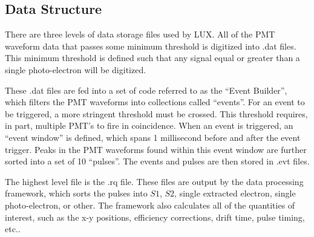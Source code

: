 \subsection{Data Structure}
There are three levels of data storage files used by LUX. All of the PMT waveform data that passes some minimum threshold is digitized into .dat files. This minimum threshold is defined such that any signal equal or greater than a single photo-electron will be digitized. 

These .dat files are fed into a set of code referred to as the ``Event Builder'', which filters the PMT waveforms into collections called ``events''. For an event to be triggered, a more stringent threshold must be crossed. This threshold requires, in part, multiple PMT's to fire in coincidence. When an event is triggered, an ``event window'' is defined, which spans 1 millisecond  before and after the event trigger. Peaks in the PMT waveforms found within this event window are further sorted into a set of 10 ``pulses''. The events and pulses are then stored in .evt files.

The highest level file is the .rq file. These files are output by the data processing framework, which sorts the pulses into $S1$, $S2$, single extracted electron, single photo-electron, or other. The framework also calculates all of the quantities of interest, such as the x-y positions, efficiency corrections, drift time, pulse timing, etc..


